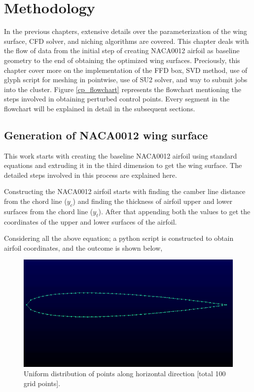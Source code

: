\chapter{Methodology}
\label{methodology}
In the previous chapters, extensive details over the parameterization of the wing surface, CFD solver, and niching algorithms are covered. This chapter deals with the flow of data from the initial step of creating NACA0012 airfoil as baseline geometry to the end of obtaining the optimized wing surfaces. Preciously, this chapter cover more on the implementation of the FFD box, SVD method, use of glyph script for meshing in pointwise, use of SU2 solver, and way to submit jobs into the cluster. Figure \ref{cp_flowchart} represents the flowchart mentioning the steps involved in obtaining perturbed control points. Every segment in the flowchart will be explained in detail in the subsequent sections.


\section{Generation of NACA0012 wing surface}
This work starts with creating the baseline NACA0012 airfoil using standard equations and extruding it in the third dimension to get the wing surface. The detailed steps involved in this process are explained here.

Constructing the NACA0012 airfoil starts with finding the camber line distance from the chord line ($y_c$) and finding the thickness of airfoil upper and lower surfaces
from the chord line ($y_t$). After that appending both the values to get the coordinates of the upper and lower surfaces of the airfoil. 



Considering all the above equation; a python script is constructed to obtain airfoil coordinates, and the outcome is shown below,
\begin{figure}[!htbp]
    \centering
    \includegraphics[scale = 0.4]{figures/airfoil_uniform_points.png}
    \caption{Uniform distribution of points along horizontal direction [total 100 grid points].}
    \label{uniform_points_airfoil}
\end{figure}

